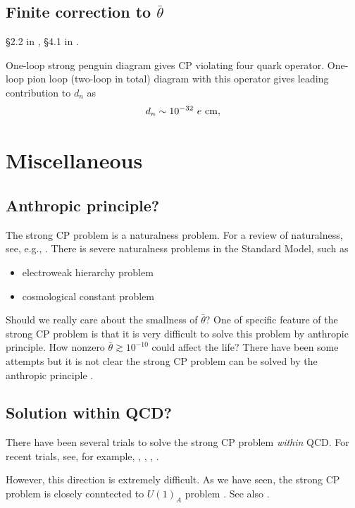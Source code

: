 \documentclass[11pt,a4paper]{article}
\begin{document}
\subsection{Finite correction to $\bar\theta$}
\S 2.2 in \cite{Dar:2000tn}, \S 4.1 in \cite{Pospelov:2005pr}.

One-loop strong penguin diagram gives CP violating four quark operator. One-loop pion loop (two-loop in total) diagram with this operator gives leading contribution to $d_n$ as \cite{Gavela:1981sk, Khriplovich:1981ca, McKellar:1987tf}
\begin{align}
    d_n \sim 10^{-32}~e~{\rm cm},
\end{align}


\section{Miscellaneous}

\subsection{Anthropic principle?}
The strong CP problem is a naturalness problem. For a review of naturalness, see, e.g., \cite{Craig:2022eqo}. There is severe naturalness problems in the Standard Model, such as
\begin{itemize}
\item electroweak hierarchy problem
\item cosmological constant problem
\end{itemize}
Should we really care about the smallness of $\bar\theta$?
One of specific feature of the strong CP problem is that it is very difficult to solve this problem by anthropic principle. 
How nonzero $\bar\theta \gtrsim 10^{-10}$ could affect the life? There have been some attempts but it is not clear the strong CP problem can be solved by the anthropic principle \cite{Ubaldi:2008nf, Dine:2018glh}.

\subsection{Solution within QCD?}
There have been several trials to solve the strong CP problem \textit{within} QCD. For recent trials, see, for example, \cite{Ai:2020ptm, Ai:2024vfa, Ai:2024cnp, Ai:2025quf}, 
\cite{Yamanaka:2022vdt, Yamanaka:2022bfj, Yamanaka:2024nzn}, 
\cite{Nakamura:2021meh, Schierholz:2024var, Schierholz:2025tns}, 
\cite{Strocchi:2024tis}.

However, this direction is extremely difficult. As we have seen, the strong CP problem is closely conntected to $U(1)_A$ problem \cite{Shifman:1979if, Gabadadze:2002ff}. See also \cite{Cohen:2018cyj} \cite{Ringwald:2026apz}.



%

\end{document}
